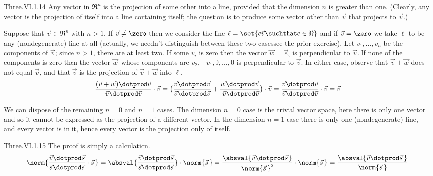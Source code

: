 \begin{ans}{Three.VI.1.14}
      Any vector in \( \Re^n \) is the projection of some other into a
      line, provided that the dimension \( n \) is greater than one.
      (Clearly, any vector is the projection of itself
      into a line containing itself; the question is to
      produce some vector other
      than $\vec{v}$ that projects to \( \vec{v} \).)

      Suppose that \( \vec{v}\in\Re^n \) with \( n>1 \).
      If \( \vec{v}\neq\zero \) then we consider the line
      \( \ell=\set{c\vec{v}\suchthat c\in\Re} \) and if \( \vec{v}=\zero \)
      we take \( \ell \) to be any (nondegenerate) line at all
      (actually, we needn't distinguish between these two cases\Dash see
      the prior exercise).
      Let \( v_1,\dots,v_n \) be the components of \( \vec{v} \);
      since \( n>1 \), there are at least two.
      If some \( v_i \) is zero then the vector \( \vec{w}=\vec{e}_i \) is
      perpendicular to \( \vec{v} \).
      If none of the components is zero then
      the vector \( \vec{w}\, \) whose components are
      \( v_2,-v_1,0,\dots ,0 \) is perpendicular to \( \vec{v} \).
      In either case, observe that \( \vec{v}+\vec{w} \) does not equal
      \( \vec{v} \), and that \( \vec{v} \) is the projection of
      \( \vec{v}+\vec{w} \) into \( \ell \).
      \begin{equation*}
        \frac{ (\vec{v}+\vec{w})\dotprod\vec{v} }{
               \vec{v}\dotprod\vec{v} }\cdot\vec{v}
        =\bigl(\frac{ \vec{v}\dotprod\vec{v} }{
                     \vec{v}\dotprod\vec{v} }+
               \frac{ \vec{w}\dotprod\vec{v} }{ \
                      \vec{v}\dotprod\vec{v} }\bigr)\cdot\vec{v}
        =\frac{ \vec{v}\dotprod\vec{v} }{ \vec{v}\dotprod\vec{v} }\cdot\vec{v}
        =\vec{v}
      \end{equation*}

      We can dispose of the remaining $n=0$ and $n=1$ cases.
      The dimension \( n=0 \) case is the trivial vector space, here
      there is only one vector and so it cannot be expressed as the projection
      of a different vector.
      In the dimension $n=1$ case there is only one (nondegenerate) line,
      and every vector is in it, hence every vector is the projection only
      of itself.
    
\end{ans}
\begin{ans}{Three.VI.1.15}
      The proof is simply a calculation.
      \begin{equation*}
        \norm{\frac{\vec{v}\dotprod\vec{s}}{\vec{s}\dotprod\vec{s}}
              \cdot\vec{s}\, }
        =
        \absval{\frac{\vec{v}\dotprod\vec{s}}{
                      \vec{s}\dotprod\vec{s}}}\cdot \norm{\vec{s}\, }
        =
        \frac{\absval{\vec{v}\dotprod\vec{s}\,}}{
                      \norm{\vec{s}\,}^2}\cdot\norm{\vec{s}\,}
        =
        \frac{\absval{\vec{v}\dotprod\vec{s}\,}}{\norm{\vec{s}\,}}
      \end{equation*}
    
\end{ans}
